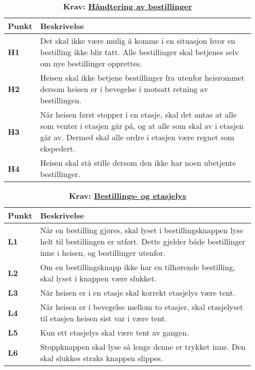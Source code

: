 \begin{table}[H]
    \centering
    \caption*{\textbf{\textcolor{NTNU_blue}{Krav}: \underline{Håndtering av bestillinger}}}
    \begin{tabular}{@{}  |p{1.25cm}| p{12.25cm}|  @{}}
    \hline
    \textbf{Punkt}             & \textbf{Beskrivelse} \\
    \hline
    \textbf{\textcolor{NTNU_blue}{H1}} & Det skal ikke være mulig å komme i en situasjon hvor en bestilling ikke blir tatt. Alle bestillinger skal betjenes selv om nye bestillinger opprettes.\\\cline{1-2} 
    \textbf{\textcolor{NTNU_blue}{H2}} & Heisen skal ikke betjene bestillinger fra utenfor heisrommet dersom heisen er i bevegelse i motsatt retning av bestillingen.\\\cline{1-2} 
    \textbf{\textcolor{NTNU_blue}{H3}} & Når heisen først stopper i en etasje, skal det antas at alle som venter i etasjen går på, og at alle som skal av i etasjen går av. Dermed skal alle ordre i etasjen være regnet som ekspedert.\\\cline{1-2} 
    \textbf{\textcolor{NTNU_blue}{H4}} & Heisen skal stå stille dersom den ikke har noen ubetjente bestillinger.\\\cline{1-2}
    \end{tabular}
\end{table}



\begin{table}[H]
    \centering
    \caption*{\textbf{\textcolor{NTNU_blue}{Krav}: \underline{Bestillings- og etasjelys}}}
    \begin{tabular}{@{}  |p{1.25cm}| p{12.25cm}|  @{}}
    \hline
     \textbf{Punkt}             & \textbf{Beskrivelse} \\
    \hline
    \textbf{\textcolor{NTNU_blue}{L1}} & Når en bestilling gjøres, skal lyset i bestillingsknappen lyse helt til bestillingen er utført. Dette gjelder både bestillinger inne i heisen, og bestillinger utenfor.\\\cline{1-2} 
    \textbf{\textcolor{NTNU_blue}{L2}} & Om en bestillingsknapp ikke har en tilhørende bestilling, skal lyset i knappen være slukket.\\\cline{1-2} 
    \textbf{\textcolor{NTNU_blue}{L3}} & Når heisen er i en etasje skal korrekt etasjelys være tent.\\\cline{1-2} 
    \textbf{\textcolor{NTNU_blue}{L4}} & Når heisen er i bevegelse mellom to etasjer, skal etasjelyset til etasjen heisen sist var i være tent.\\\cline{1-2} 
    \textbf{\textcolor{NTNU_blue}{L5}} & Kun ett etasjelys skal være tent av gangen.\\\cline{1-2} 
    \textbf{\textcolor{NTNU_blue}{L6}} & Stoppknappen skal lyse så lenge denne er trykket inne. Den skal slukkes straks knappen slippes.\\\cline{1-2} 
    \end{tabular}
\end{table}


